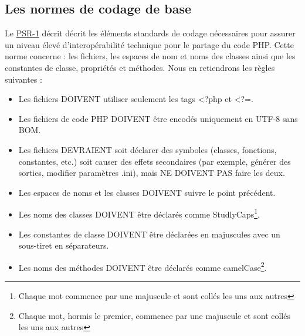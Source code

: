 \subsection{Les normes de codage de base}
Le \href{http://www.php-fig.org/psr/psr-1/}{PSR-1} décrit décrit les éléments standards de codage nécessaires pour assurer un niveau élevé d'interopérabilité technique pour le partage du code PHP. Cette norme concerne : les fichiers, les espaces de nom et noms des classes ainsi que les constantes de classe, propriétés et méthodes. Nous en retiendrons les règles suivantes :
\begin{itemize}[label=\textbullet]
  \item Les fichiers DOIVENT utiliser seulement les tags <?php et <?=.
  \item Les fichiers de code PHP DOIVENT être encodés uniquement en UTF-8 sans BOM.
  \item Les fichiers DEVRAIENT soit déclarer des symboles (classes, fonctions, constantes, etc.) soit causer des effets secondaires (par exemple, générer des sorties, modifier paramètres .ini), mais NE DOIVENT PAS faire les deux.
  \item Les espaces de noms et les classes DOIVENT suivre le point précédent.
  \item Les noms des classes DOIVENT être déclarés comme StudlyCaps\footnote{\label{StudlyCaps}Chaque mot commence par une majuscule et sont collés les uns aux autres}.
  \item Les constantes de classe DOIVENT être déclarées en majuscules avec un sous-tiret en séparateurs.
  \item Les noms des méthodes DOIVENT être déclarés comme camelCase\footnote{\label{camelCase}Chaque mot, hormis le premier, commence par une majuscule et sont collés les uns aux autres}.
\end{itemize}

